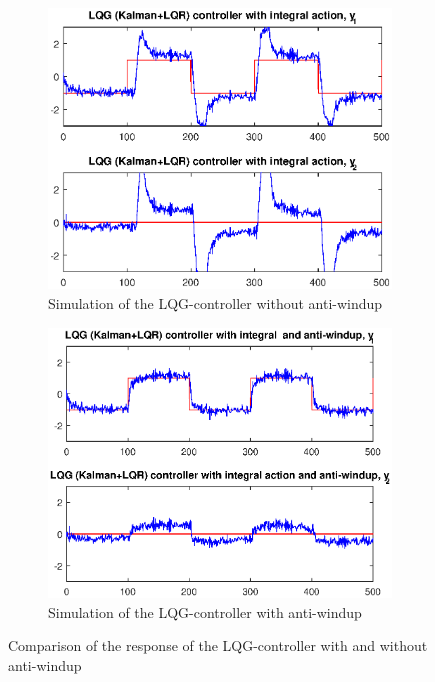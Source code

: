 \documentclass[a4paper]{scrartcl}
\begin{document}
\begin{figure}
\centering
\begin{subfigure}{.5\textwidth}
	\centering
	\includegraphics[width = .9\linewidth]{fig/task1/LQG.eps}
	\caption{Simulation of the LQG-controller without anti-windup}
	\label{fig:LQGsimwithout}	
\end{subfigure}%
\begin{subfigure}{.5\textwidth}
	\centering
	\includegraphics[width = .9\linewidth]{fig/task1/LQG_antiwindup.eps}
	\caption{Simulation of the LQG-controller with anti-windup}
	\label{fig:LQGsimwith}	
\end{subfigure}
\caption{Comparison of the response of the LQG-controller with and without anti-windup}
\label{fig:LQGsim}
\end{figure}
\end{document}
